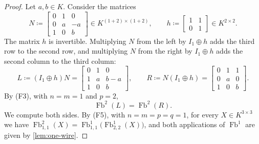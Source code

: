 \documentclass[11pt,a4paper]{article}
\theoremstyle{plain}
\theoremstyle{definition}
\theoremstyle{remark}
\DeclareMathOperator{\Fb}{Fb}
\begin{document}
\begin{proof}
    Let $a, b \in K$.
    Consider the matrices
    \begin{equation*}
        N \coloneqq \begin{bmatrix} 0 & 1 & 0 \\ 0 & a & -a \\ 1 & 0 & b \end{bmatrix} \in K^{(1+2) \times (1+2)},
        \qquad
        h \coloneqq \begin{bmatrix} 1 & 1 \\ 0 & 1 \end{bmatrix} \in K^{2 \times 2} .
    \end{equation*}
    The matrix $h$ is invertible.
    Multiplying $N$ from the left by $I_1 \oplus h$ adds the third row to the second row, and multiplying $N$ from the right by $I_1 \oplus h$ adds the second column to the third column:
    \begin{equation*}
        L \coloneqq (I_1 \oplus h) N = \begin{bmatrix} 0 & 1 & 0 \\ 1 & a & b - a \\ 1 & 0 & b \end{bmatrix},
        \qquad
        R \coloneqq N (I_1 \oplus h) = \begin{bmatrix} 0 & 1 & 1 \\ 0 & a & 0 \\ 1 & 0 & b \end{bmatrix} .
    \end{equation*}
    By (F3), with $n = m = 1$ and $p = 2$,
    \begin{equation}
        \label{eq:L-equals-R}
        \Fb^2(L) = \Fb^2(R) .
    \end{equation}
    We compute both sides.
    By (F5), with $n = m = p = q = 1$, for every $X \in K^{3 \times 3}$ we have $\Fb^2_{1,1}(X) = \Fb^1_{1,1}\bigl( \Fb^1_{2,2}(X) \bigr)$, and both applications of $\Fb^1$ are given by \cref{lem:one-wire}.


\end{proof}
\end{document}
